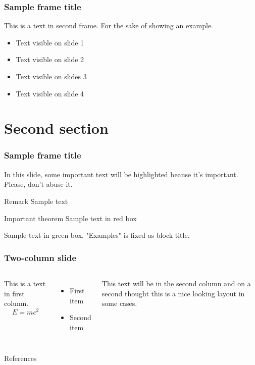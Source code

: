 \documentclass{beamer}
\begin{document}
\begin{frame}
\frametitle{Sample frame title}
This is a text in second frame. For the sake of showing an example.

\begin{itemize}
\item<1-> Text visible on slide 1
\item<2-> Text visible on slide 2
\item<3> Text visible on slides 3
\item<4-> Text visible on slide 4
\end{itemize}
\end{frame}


\section{Second section}

\begin{frame}
\frametitle{Sample frame title}

In this slide, some important text will be
\alert{highlighted} beause it's important.
Please, don't abuse it.

\begin{block}{Remark}
Sample text
\end{block}

\begin{alertblock}{Important theorem}
Sample text in red box
\end{alertblock}

\begin{examples}
Sample text in green box. "Examples" is fixed as block title.
\end{examples}
\end{frame}


\begin{frame}
\frametitle{Two-column slide}

\begin{columns}

This is a text in first column.
$$E=mc^2$$
\begin{itemize}
\item First item
\item Second item
\end{itemize}

This text will be in the second column
and on a second thought this is a nice looking
layout in some cases.
\end{columns}
\end{frame}

\begin{frame}{References}
\nocite{*}


\end{frame}
\end{document}
